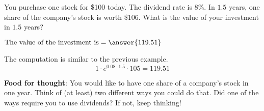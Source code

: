 \documentclass{ximera}
\begin{document}
\begin{question}
You purchase one stock for \$100 today. The dividend rate is 8\%. In $1.5$ years, one share of the company's stock is  worth \$106. What is the value of your investment in $1.5$ years?
	\begin{prompt}
		$\text{The value of the investment is}=\answer{119.51}$
	\end{prompt}
\end{question}

\begin{solution}
The computation is similar to the previous example.
	\begin{equation*}
		1\cdot e^{0.08\cdot 1.5}\cdot 105=119.51
	\end{equation*}
\end{solution}

{\bf Food for thought}: You would like to have one share of a company's stock in one year. Think of (at least) two different ways you could do that. Did one of the ways require you to use dividends? If not, keep thinking!
\end{document}
